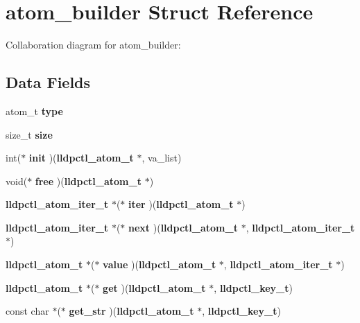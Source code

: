 \section{atom\-\_\-builder \-Struct \-Reference}
\label{structatom__builder}


\-Collaboration diagram for atom\-\_\-builder\-:
\subsection*{\-Data \-Fields}
\begin{DoxyCompactItemize}
\item 
atom\-\_\-t {\bfseries type}\label{structatom__builder_abdbec1b06da35337979bb89b80f2cbdc}

\item 
size\-\_\-t {\bfseries size}\label{structatom__builder_a854352f53b148adc24983a58a1866d66}

\item 
int($\ast$ {\bfseries init} )({\bf lldpctl\-\_\-atom\-\_\-t} $\ast$, va\-\_\-list)\label{structatom__builder_a860f74f68b6f84221d8eb59bfe882424}

\item 
void($\ast$ {\bfseries free} )({\bf lldpctl\-\_\-atom\-\_\-t} $\ast$)\label{structatom__builder_abf37b809c354846f69a660ba2ab4f12e}

\item 
{\bf lldpctl\-\_\-atom\-\_\-iter\-\_\-t} $\ast$($\ast$ {\bfseries iter} )({\bf lldpctl\-\_\-atom\-\_\-t} $\ast$)\label{structatom__builder_ac576180f19590b1e13fd216d65436f39}

\item 
{\bf lldpctl\-\_\-atom\-\_\-iter\-\_\-t} $\ast$($\ast$ {\bfseries next} )({\bf lldpctl\-\_\-atom\-\_\-t} $\ast$, {\bf lldpctl\-\_\-atom\-\_\-iter\-\_\-t} $\ast$)\label{structatom__builder_a36d0e289dbebcfb4ed3b2954405fb544}

\item 
{\bf lldpctl\-\_\-atom\-\_\-t} $\ast$($\ast$ {\bfseries value} )({\bf lldpctl\-\_\-atom\-\_\-t} $\ast$, {\bf lldpctl\-\_\-atom\-\_\-iter\-\_\-t} $\ast$)\label{structatom__builder_ac96678858ceac38733976a89542877e3}

\item 
{\bf lldpctl\-\_\-atom\-\_\-t} $\ast$($\ast$ {\bfseries get} )({\bf lldpctl\-\_\-atom\-\_\-t} $\ast$, {\bf lldpctl\-\_\-key\-\_\-t})\label{structatom__builder_ae15e764c71411c0c52eff124a0baa413}

\item 
const char $\ast$($\ast$ {\bfseries get\-\_\-str} )({\bf lldpctl\-\_\-atom\-\_\-t} $\ast$, {\bf lldpctl\-\_\-key\-\_\-t})\label{structatom__builder_a9ecc4fbd95df2d106e004677ad3f86ea}


\end{DoxyCompactItemize}
